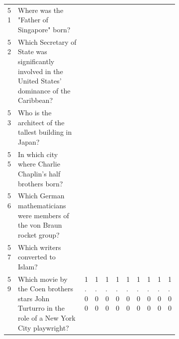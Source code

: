 \begin{longtable}{@{}lp{0.4\linewidth}lllllllll@{}}
\hline
51       & Where was the "Father of Singapore" born?                                                                   & \cellcolor[HTML]{BBDAFF}    & \cellcolor[HTML]{BBDAFF}     & \cellcolor[HTML]{BBDAFF}     & \cellcolor[HTML]{BBDAFF}  & \cellcolor[HTML]{BBDAFF}  & \cellcolor[HTML]{BBDAFF}  & \cellcolor[HTML]{BBDAFF} & \cellcolor[HTML]{BBDAFF} & \cellcolor[HTML]{BBDAFF} \\
52       & Which Secretary of State was significantly involved in the United States' dominance of the Caribbean?       & \cellcolor[HTML]{FE0000}   & \cellcolor[HTML]{FE0000}    & \cellcolor[HTML]{FE0000}    & \cellcolor[HTML]{FE0000} & \cellcolor[HTML]{FE0000} & \cellcolor[HTML]{FE0000} & \cellcolor[HTML]{FE0000} & \cellcolor[HTML]{FE0000} & \cellcolor[HTML]{FE0000} \\
53       & Who is the architect of the tallest building in Japan?                                                      & \cellcolor[HTML]{BBDAFF}    & \cellcolor[HTML]{BBDAFF}     & \cellcolor[HTML]{BBDAFF}     & \cellcolor[HTML]{BBDAFF}  & \cellcolor[HTML]{BBDAFF}  & \cellcolor[HTML]{BBDAFF}  & \cellcolor[HTML]{BBDAFF} & \cellcolor[HTML]{BBDAFF} & \cellcolor[HTML]{BBDAFF} \\
55       & In which city where Charlie Chaplin's half brothers born?                                                   & \cellcolor[HTML]{BBDAFF}    & \cellcolor[HTML]{BBDAFF}     & \cellcolor[HTML]{BBDAFF}     & \cellcolor[HTML]{BBDAFF}  & \cellcolor[HTML]{BBDAFF}  & \cellcolor[HTML]{BBDAFF}  & \cellcolor[HTML]{BBDAFF} & \cellcolor[HTML]{BBDAFF} & \cellcolor[HTML]{BBDAFF} \\
56       & Which German mathematicians were members of the von Braun rocket group?                                     & \cellcolor[HTML]{FE0000}   & \cellcolor[HTML]{FE0000}    & \cellcolor[HTML]{FE0000}    & \cellcolor[HTML]{FE0000} & \cellcolor[HTML]{FE0000} & \cellcolor[HTML]{FE0000} & \cellcolor[HTML]{FE0000} & \cellcolor[HTML]{FE0000} & \cellcolor[HTML]{FE0000} \\
57       & Which writers converted to Islam?                                                                           & \cellcolor[HTML]{BBDAFF}    & \cellcolor[HTML]{BBDAFF}     & \cellcolor[HTML]{BBDAFF}     & \cellcolor[HTML]{BBDAFF}  & \cellcolor[HTML]{BBDAFF}  & \cellcolor[HTML]{BBDAFF}  & \cellcolor[HTML]{BBDAFF} & \cellcolor[HTML]{BBDAFF} & \cellcolor[HTML]{BBDAFF} \\
59       & Which movie by the Coen brothers stars John Turturro in the role of a New York City playwright?             & 1.00                        & 1.00                         & 1.00                         & 1.00                      & 1.00                      & 1.00                      & 1.00                     & 1.00                     & 1.00                     \\

\end{longtable}
